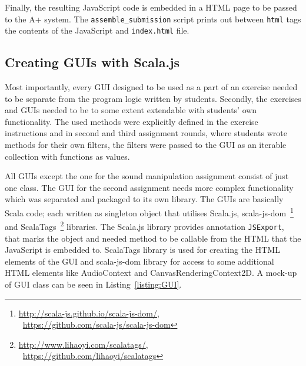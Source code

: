 Finally, the resulting JavaScript code is embedded in a HTML page to be passed to the A+ system. The \texttt{assemble\_submission} script prints out between \texttt{html} tags the contents of the JavaScript and \texttt{index.html} file.


\subsection{Creating GUIs with Scala.js}

Most importantly, every GUI designed to be used as a part of an exercise needed to be separate from the program logic written by students. Secondly, the exercises and GUIs needed to be to some extent extendable with students' own functionality. The used methods were explicitly defined in the exercise instructions and in second and third assignment rounds, where students wrote methods for their own filters, the filters were passed to the GUI as an iterable collection with functions as values.

All GUIs except the one for the sound manipulation assignment consist of just one class. The GUI for the second assignment needs more complex functionality which was separated and packaged to its own library. The GUIs are basically Scala code; each written as singleton object that utilises Scala.js, scala-js-dom~\footnote{ \url{http://scala-js.github.io/scala-js-dom/},\\~\url{https://github.com/scala-js/scala-js-dom}} and ScalaTags~\footnote{ \url{http://www.lihaoyi.com/scalatags/},\\~\url{https://github.com/lihaoyi/scalatags}} libraries. The Scala.js library provides annotation \texttt{JSExport}, that marks the object and needed method to be callable from the HTML that the JavaScript is embedded to. ScalaTags library is used for creating the HTML elements of the GUI and scala-js-dom library for access to some additional HTML elements like AudioContext and CanvasRenderingContext2D. A mock-up of GUI class can be seen in Listing~\ref{listing:GUI}.


